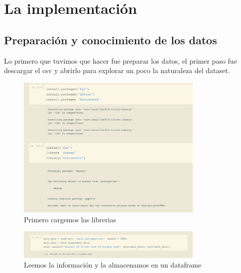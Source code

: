 \documentclass[12pt, fleqn]{report}                             %
\theoremstyle{break}                                            %
\begin{document}
    \chapter{La implementación}

        \section{Preparación y conocimiento de los datos}

        Lo primero que tuvimos que hacer fue preparar los datos, el primer paso fue descargar el csv y abrirlo para explorar un poco
        la naturaleza del dataset.

        \begin{figure}[h!]
            \centering
            \includegraphics[width=0.8\textwidth]{1}
            \caption{Primero cargemos las librerias}
        \end{figure}

        \begin{figure}[h!]
            \centering
            \includegraphics[width=0.8\textwidth]{2}
            \caption{Leemos la información y la almacenamos en un dataframe}
        \end{figure}
\end{document}
